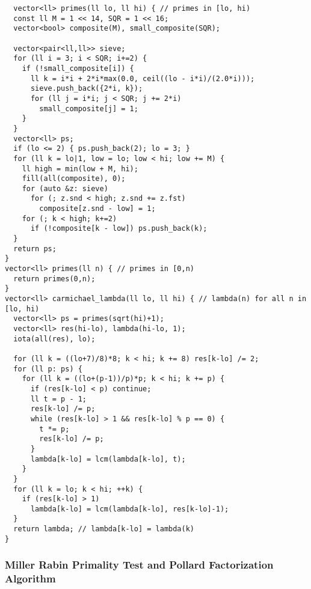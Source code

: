 \begin{multicols}{2}
\begin{lstlisting}
  vector<ll> primes(ll lo, ll hi) { // primes in [lo, hi)
  const ll M = 1 << 14, SQR = 1 << 16;
  vector<bool> composite(M), small_composite(SQR);

  vector<pair<ll,ll>> sieve; 
  for (ll i = 3; i < SQR; i+=2) {
    if (!small_composite[i]) {
      ll k = i*i + 2*i*max(0.0, ceil((lo - i*i)/(2.0*i)));
      sieve.push_back({2*i, k});
      for (ll j = i*i; j < SQR; j += 2*i) 
        small_composite[j] = 1;
    }
  }
  vector<ll> ps; 
  if (lo <= 2) { ps.push_back(2); lo = 3; }
  for (ll k = lo|1, low = lo; low < hi; low += M) {
    ll high = min(low + M, hi);
    fill(all(composite), 0);
    for (auto &z: sieve) 
      for (; z.snd < high; z.snd += z.fst)
        composite[z.snd - low] = 1;
    for (; k < high; k+=2) 
      if (!composite[k - low]) ps.push_back(k);
  }
  return ps;
}
vector<ll> primes(ll n) { // primes in [0,n)
  return primes(0,n);
}
vector<ll> carmichael_lambda(ll lo, ll hi) { // lambda(n) for all n in [lo, hi)
  vector<ll> ps = primes(sqrt(hi)+1);
  vector<ll> res(hi-lo), lambda(hi-lo, 1);
  iota(all(res), lo);

  for (ll k = ((lo+7)/8)*8; k < hi; k += 8) res[k-lo] /= 2;
  for (ll p: ps) {
    for (ll k = ((lo+(p-1))/p)*p; k < hi; k += p) {
      if (res[k-lo] < p) continue;
      ll t = p - 1;
      res[k-lo] /= p;
      while (res[k-lo] > 1 && res[k-lo] % p == 0) {
        t *= p;
        res[k-lo] /= p; 
      }
      lambda[k-lo] = lcm(lambda[k-lo], t);
    }
  }
  for (ll k = lo; k < hi; ++k) {
    if (res[k-lo] > 1) 
      lambda[k-lo] = lcm(lambda[k-lo], res[k-lo]-1);
  }
  return lambda; // lambda[k-lo] = lambda(k)
}
\end{lstlisting}
\end{multicols}

\newpage

\subsubsection{Miller Rabin Primality Test and Pollard Factorization Algorithm}

\hrulefill \vspace{-\baselineskip}
\begin{multicols}{2}
\inputminted[autogobble,fontsize=\footnotesize]{C++}{Maths/pollard.cpp}
\end{multicols}
\vspace{-\baselineskip}
\noindent \hrulefill


